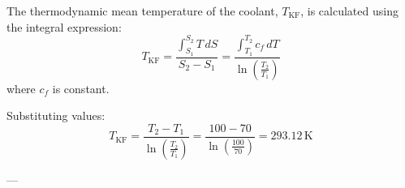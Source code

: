 The thermodynamic mean temperature of the coolant, \( T_{\text{KF}} \), is calculated using the integral expression:  
\[
T_{\text{KF}} = \frac{\int_{S_1}^{S_2} T \, dS}{S_2 - S_1} = \frac{\int_{T_1}^{T_2} c_f \, dT}{\ln \left( \frac{T_2}{T_1} \right)}
\]  
where \( c_f \) is constant.  

Substituting values:  
\[
T_{\text{KF}} = \frac{T_2 - T_1}{\ln \left( \frac{T_2}{T_1} \right)} = \frac{100 - 70}{\ln \left( \frac{100}{70} \right)} = 293.12 \, \text{K}
\]  

---